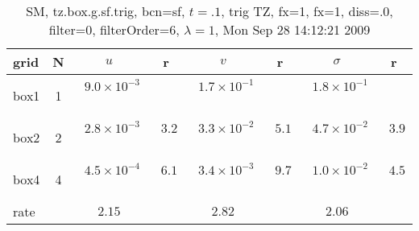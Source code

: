 \begin{table}[hbt]\tableFont %
\begin{center}
\begin{tabular}{|l|c|c|c|c|c|c|c|} \hline 
grid  & N &  $u$  & r &  $v$  & r &  $\sigma$   & r \\ \hline 
                box1 &     1 & ~$9.0\times10^{ -3}$~ &           & ~$1.7\times10^{ -1}$~ &           & ~$1.8\times10^{ -1}$~ &            \\ \hline
                box2 &     2 & ~$2.8\times10^{ -3}$~ & ~$  3.2$~ & ~$3.3\times10^{ -2}$~ & ~$  5.1$~ & ~$4.7\times10^{ -2}$~ & ~$  3.9$~  \\ \hline
                box4 &     4 & ~$4.5\times10^{ -4}$~ & ~$  6.1$~ & ~$3.4\times10^{ -3}$~ & ~$  9.7$~ & ~$1.0\times10^{ -2}$~ & ~$  4.5$~  \\ \hline
    rate             &       &       $2.15$         &       &       $2.82$         &       &       $2.06$         &        \\ \hline
\end{tabular}
\caption{SM, tz.box.g.sf.trig, bcn=sf, $t=.1$, trig TZ, fx=1, fx=1, diss=.0, filter=0, filterOrder=6, $\lambda=1$, Mon Sep 28 14:12:21 2009}\label{table:tz.box.g.sf.trig}
\end{center}
\end{table}
